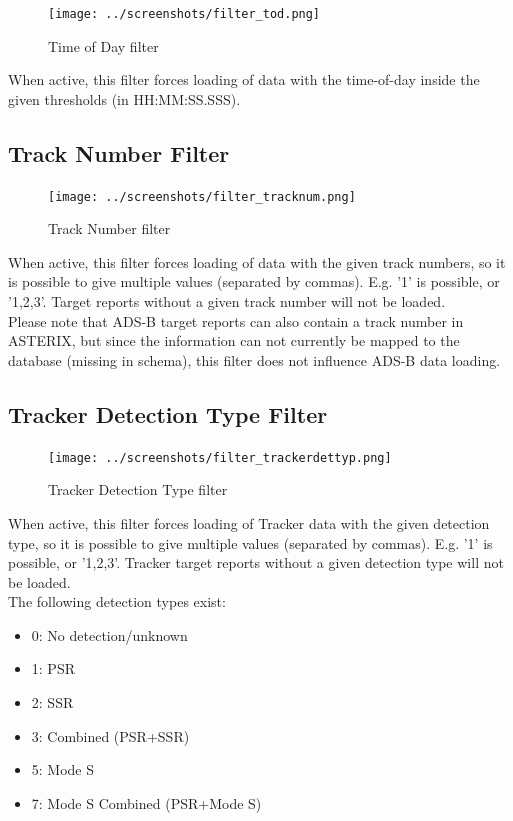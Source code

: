\begin{figure}[H]
  \center
    \texttt{[image: ../screenshots/filter\_tod.png]}
  \caption{Time of Day filter}
\end{figure}

When active, this filter forces loading of data with the time-of-day inside the given thresholds (in HH:MM:SS.SSS).

\subsection{Track Number Filter}

\begin{figure}[H]
  \center
    \texttt{[image: ../screenshots/filter\_tracknum.png]}
  \caption{Track Number filter}
\end{figure}

When active, this filter forces loading of data with the given track numbers, so it is possible to give multiple values (separated by commas). E.g. '1' is possible, or '1,2,3'. Target reports without a given track number will not be loaded. \\

Please note that ADS-B target reports can also contain a track number in ASTERIX, but since the information can not currently be mapped to the database (missing in schema), this filter does not influence ADS-B data loading.

\subsection{Tracker Detection Type Filter}

\begin{figure}[H]
  \center
    \texttt{[image: ../screenshots/filter\_trackerdettyp.png]}
  \caption{Tracker Detection Type filter}
\end{figure}

When active, this filter forces loading of Tracker data with the given detection type, so it is possible to give multiple values (separated by commas). E.g. '1' is possible, or '1,2,3'. Tracker target reports without a given detection type will not be loaded. \\

The following detection types exist:
\begin{itemize}
 \item 0: No detection/unknown
 \item 1: PSR
 \item 2: SSR
 \item 3: Combined (PSR+SSR)
 \item 5: Mode S
 \item 7: Mode S Combined (PSR+Mode S)
\end{itemize}
\  \\

